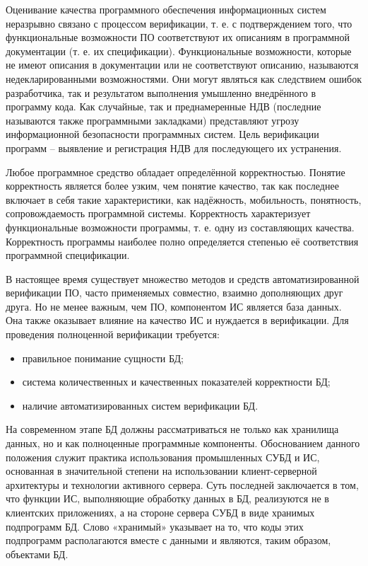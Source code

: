 Оценивание качества программного обеспечения информационных систем неразрывно связано с процессом верификации,
т. е. с подтверждением того, что функциональные возможности ПО соответствуют их описаниям в программной документации
(т. е. их спецификации). Функциональные возможности, которые не имеют описания в документации или не соответствуют
описанию, называются недекларированными возможностями. Они могут являться как следствием ошибок разработчика,
так и результатом выполнения умышленно внедрённого в программу кода. Как случайные, так и преднамеренные НДВ
(последние называются также программными закладками) представляют угрозу информационной безопасности программных
систем. Цель верификации программ – выявление и регистрация НДВ для последующего их устранения.

Любое программное средство обладает определённой корректностью. Понятие корректность является более узким,
чем понятие качество, так как последнее включает в себя такие характеристики, как надёжность, мобильность,
понятность, сопровождаемость программной системы. Корректность характеризует функциональные возможности программы,
т. е. одну из составляющих качества. Корректность программы наиболее полно определяется степенью её соответствия
программной спецификации.

В настоящее время существует множество методов и средств автоматизированной верификации ПО, часто применяемых
совместно, взаимно дополняющих друг друга. Но не менее важным, чем ПО, компонентом ИС является база данных.
Она также оказывает влияние на качество ИС и нуждается в верификации. Для проведения полноценной
верификации требуется:
\begin{itemize}
    \item правильное понимание сущности БД;

    \item система количественных и качественных показателей корректности БД;

    \item наличие автоматизированных систем верификации БД.
\end{itemize}

На современном этапе БД должны рассматриваться не только как хранилища данных, но и как полноценные программные
компоненты. Обоснованием данного положения служит практика использования промышленных СУБД и ИС, основанная
в значительной степени на использовании клиент-серверной архитектуры и технологии активного сервера. Суть последней
заключается в том, что функции ИС, выполняющие обработку данных в БД, реализуются не в клиентских приложениях, а
на стороне сервера СУБД в виде хранимых подпрограмм БД. Слово «хранимый» указывает на то, что коды этих подпрограмм
располагаются вместе с данными и являются, таким образом, объектами БД.

